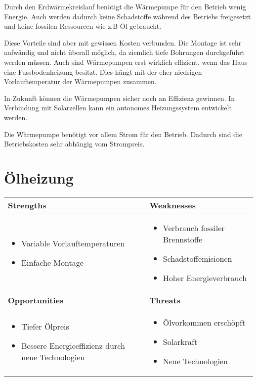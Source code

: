 Durch den Erdwärmekreislauf benötigt die Wärmepumpe für den Betrieb wenig Energie. Auch werden dadurch keine Schadstoffe während des Betriebs freigesetzt und keine fossilen Ressourcen wie z.B Öl gebraucht.

Diese Vorteile sind aber mit gewissen Kosten verbunden. Die Montage ist sehr aufwändig und nicht überall möglich, da ziemlich tiefe Bohrungen durchgeführt werden müssen. Auch sind Wärmepumpen erst wirklich effizient, wenn das Haus eine Fussbodenheizung besitzt. Dies hängt mit der eher niedrigen Vorlauftemperatur der Wärmepumpen zusammen.

In Zukunft können die Wärmepumpen sicher noch an Effizienz gewinnen. In Verbindung mit Solarzellen kann ein autonomes Heizungssystem entwickelt werden.

Die Wärmepumpe benötigt vor allem Strom für den Betrieb. Dadurch sind die Betriebskosten sehr abhängig vom Strompreis. 


\section{Ölheizung}

\begin{tabular}[c]{|p{}|p{}|}
  \hline
  \textbf{Strengths} &
  \textbf{Weaknesses} \\ \hline
  
  \begin{itemize}
    \item Variable Vorlauftemperaturen
    \item Einfache Montage
  \end{itemize}
  &
  
  \begin{itemize}
    \item Verbrauch fossiler Brennstoffe
    \item Schadstoffemisionen
    \item Hoher Energieverbrauch
  \end{itemize}
  \\ \hline
  
  \textbf{Opportunities} &
  \textbf{Threats} \\ \hline
  
  \begin{itemize}
    \item Tiefer Ölpreis
    \item Bessere Energieeffizienz durch neue Technologien
  \end{itemize}
  &
  
  \begin{itemize}
  	\item Ölvorkommen erschöpft
    \item Solarkraft
    \item Neue Technologien
  \end{itemize}  
  \\ \hline
\end{tabular}

